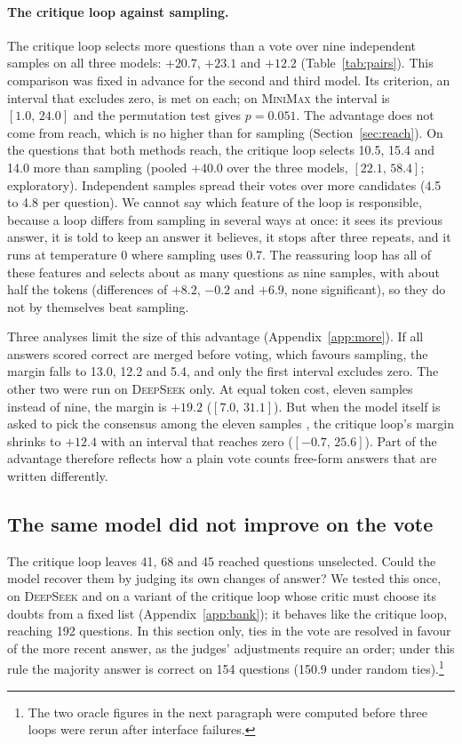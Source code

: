 \documentclass[11pt]{article}
\newcommand{\ds}{\textsc{DeepSeek}}
\newcommand{\mm}{\textsc{MiniMax}}
\newcommand{\ci}[2]{$[#1,\,#2]$}
\begin{document}
\paragraph{The critique loop against sampling.}
The critique loop selects more questions than a vote over nine independent samples on all three models: $+20.7$, $+23.1$ and $+12.2$ (Table~\ref{tab:pairs}).
This comparison was fixed in advance for the second and third model.
Its criterion, an interval that excludes zero, is met on each; on \mm{} the interval is \ci{1.0}{24.0} and the permutation test gives $p=0.051$.
The advantage does not come from reach, which is no higher than for sampling (Section~\ref{sec:reach}).
On the questions that both methods reach, the critique loop selects 10.5, 15.4 and 14.0 more than sampling (pooled $+40.0$ over the three models, \ci{22.1}{58.4}; exploratory).
Independent samples spread their votes over more candidates (4.5 to 4.8 per question).
We cannot say which feature of the loop is responsible, because a loop differs from sampling in several ways at once: it sees its previous answer, it is told to keep an answer it believes, it stops after three repeats, and it runs at temperature 0 where sampling uses 0.7.
The reassuring loop has all of these features and selects about as many questions as nine samples, with about half the tokens (differences of $+8.2$, $-0.2$ and $+6.9$, none significant), so they do not by themselves beat sampling.

Three analyses limit the size of this advantage (Appendix~\ref{app:more}).
If all answers scored correct are merged before voting, which favours sampling, the margin falls to 13.0, 12.2 and 5.4, and only the first interval excludes zero.
The other two were run on \ds{} only.
At equal token cost, eleven samples instead of nine, the margin is $+19.2$ (\ci{7.0}{31.1}).
But when the model itself is asked to pick the consensus among the eleven samples \citep{chen2023usc}, the critique loop's margin shrinks to $+12.4$ with an interval that reaches zero (\ci{-0.7}{25.6}).
Part of the advantage therefore reflects how a plain vote counts free-form answers that are written differently.

\subsection{The same model did not improve on the vote}
\label{sec:judges}

The critique loop leaves 41, 68 and 45 reached questions unselected.
Could the model recover them by judging its own changes of answer?
We tested this once, on \ds{} and on a variant of the critique loop whose critic must choose its doubts from a fixed list (Appendix~\ref{app:bank}); it behaves like the critique loop, reaching 192 questions.
In this section only, ties in the vote are resolved in favour of the more recent answer, as the judges' adjustments require an order; under this rule the majority answer is correct on 154 questions (150.9 under random ties).\footnote{The two oracle figures in the next paragraph were computed before three loops were rerun after interface failures.}
\end{document}
